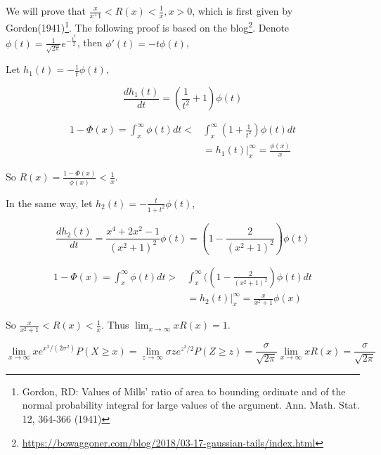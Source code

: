 \documentclass{article}
\begin{document}
We will prove that $\frac{x}{x^+1} <  R(x) < \frac{1}{x}, x>0$, which is first given by Gorden(1941)\footnote{Gordon, RD: Values of Mills’ ratio of area to bounding ordinate and of the normal probability integral for large values of the argument. Ann. Math. Stat. 12, 364-366 (1941)}. The following proof is based on the blog\footnote{\url{https://bowaggoner.com/blog/2018/03-17-gaussian-tails/index.html}}. Denote $\phi(t) = \frac{1}{\sqrt{2\pi}} e^{-\frac{t^2}{2}}$, then $\phi'(t) = -t \phi(t)$, 

Let $h_1(t) = -\frac{1}{t} \phi(t)$,

\begin{equation}
    \frac{d h_1(t)}{dt} = (\frac{1}{t^2}+1) \phi(t) 
\end{equation}

\begin{equation}
    \begin{aligned}
        1-\Phi(x) = \int_{x}^{\infty} \phi(t) dt < &\int_{x}^{\infty} (1+\frac{1}{t^2})\phi(t) dt \\
        & = h_1(t)\big|_{x}^{\infty} = \frac{\phi(x)}{x}
    \end{aligned}
\end{equation}

So $R(x) = \frac{1-\Phi(x)}{\phi(x)} < \frac{1}{x}$.

In the same way, let $h_2(t) = -\frac{t}{1+t^2} \phi(t)$,

\begin{equation}
    \frac{d h_2(t)}{dt} = \frac{x^4+2x^2-1}{(x^2+1)^2} \phi(t)  = (1-\frac{2}{(x^2+1)^2}) \phi(t)
\end{equation}

\begin{equation}
    \begin{aligned}
        1-\Phi(x) = \int_{x}^{\infty} \phi(t) dt > & \int_{x}^{\infty} ( (1-\frac{2}{(x^2+1)^2}) \phi(t)dt \\
        & = h_2(t)\big|_{x}^{\infty} = \frac{x}{x^2+1}\phi(x)
    \end{aligned}
\end{equation}

So $\frac{x}{x^2+1}<R(x) < \frac{1}{x}$. Thus $\lim_{x\to \infty} xR(x) = 1$.

\begin{equation}
    \lim_{x\to\infty} xe^{x^2/(2\sigma^2)} P(X\geqslant x) = \lim_{z\to\infty} \sigma z e^{z^2/2} P(Z\geqslant z) = \frac{ \sigma}{\sqrt{2\pi}} \lim_{x\to \infty} xR(x) =  \frac{ \sigma}{\sqrt{2\pi}}
\end{equation}
\end{document}
